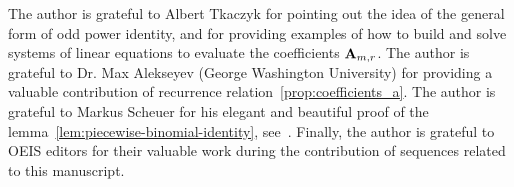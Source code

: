 The author is grateful to Albert Tkaczyk for pointing out the idea of the general form of odd power identity,
and for providing examples of how to build and solve systems of linear equations to evaluate
the coefficients ${\mathbf{A}} \sb{m,r}$.
The author is grateful to Dr. Max Alekseyev (George Washington University) for providing a valuable contribution
of recurrence relation~\eqref{prop:coefficients_a}.
The author is grateful to Markus Scheuer for his elegant and beautiful proof
of the lemma~\eqref{lem:piecewise-binomial-identity}, see~\cite{scheuer2023mathstackexchange}.
Finally, the author is grateful to OEIS editors for their valuable work during the contribution of sequences
related to this manuscript.
